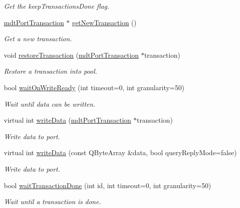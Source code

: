 \begin{DoxyCompactItemize}
\begin{DoxyCompactList}\small\item\em Get the keepTransactionsDone flag. \end{DoxyCompactList}\item 
\hyperlink{classmdt_port_transaction}{mdtPortTransaction} $\ast$ \hyperlink{classmdt_port_manager_a75ebd3d1859e3ed38b9558981e53aac4}{getNewTransaction} ()
\begin{DoxyCompactList}\small\item\em Get a new transaction. \end{DoxyCompactList}\item 
void \hyperlink{classmdt_port_manager_a5fea4a9b8e94d38e8ec699dba05c7ca8}{restoreTransaction} (\hyperlink{classmdt_port_transaction}{mdtPortTransaction} $\ast$transaction)
\begin{DoxyCompactList}\small\item\em Restore a transaction into pool. \end{DoxyCompactList}\item 
bool \hyperlink{classmdt_port_manager_a1ca92c5ac120d87e5b10bff54ed1aa5c}{waitOnWriteReady} (int timeout=0, int granularity=50)
\begin{DoxyCompactList}\small\item\em Wait until data can be written. \end{DoxyCompactList}\item 
virtual int \hyperlink{classmdt_port_manager_a328abc7f5f2677c19ea11567df6597da}{writeData} (\hyperlink{classmdt_port_transaction}{mdtPortTransaction} $\ast$transaction)
\begin{DoxyCompactList}\small\item\em Write data to port. \end{DoxyCompactList}\item 
virtual int \hyperlink{classmdt_port_manager_a9b902a60c8b21585904bcb1d6e604369}{writeData} (const QByteArray \&data, bool queryReplyMode=false)
\begin{DoxyCompactList}\small\item\em Write data to port. \end{DoxyCompactList}\item 
bool \hyperlink{classmdt_port_manager_aaa8845faa91904dba625fe7f1d23bc51}{waitTransactionDone} (int id, int timeout=0, int granularity=50)
\begin{DoxyCompactList}\small\item\em Wait until a transaction is done. \end{DoxyCompactList}\item 

\end{DoxyCompactItemize}
